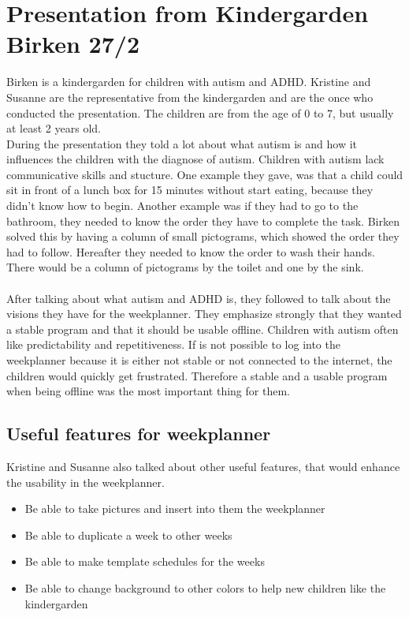\section{Presentation from Kindergarden Birken 27/2}
Birken is a kindergarden for children with autism and ADHD.
Kristine and Susanne are the representative from the kindergarden and are the once who conducted the presentation.
The children are from the age of 0 to 7, but usually at least 2 years old.
\\
During the presentation they told a lot about what autism is and how it influences the children with the diagnose of autism.
Children with autism lack communicative skills and stucture. 
One example they gave, was that a child could sit in front of a lunch box for 15 minutes without start eating, because they didn't know how to begin.
Another example was if they had to go to the bathroom, they needed to know the order they have to complete the task.
Birken solved this by having a column of small pictograms, which showed the order they had to follow. 
Hereafter they needed to know the order to wash their hands.
There would be a column of pictograms by the toilet and one by the sink.
\\\\
After talking about what autism and ADHD is, they followed to talk about the visions they have for the weekplanner.
They emphasize strongly that they wanted a stable program and that it should be usable offline.
Children with autism often like predictability and repetitiveness. 
If is not possible to log into the weekplanner because it is either not stable or not connected to the internet, the children would quickly get frustrated.
Therefore a stable and a usable program when being offline was the most important thing for them.

\subsection{Useful features for weekplanner}
Kristine and Susanne also talked about other useful features, that would enhance the usability in the weekplanner.

\begin{itemize}
    \item Be able to take pictures and insert into them the weekplanner
    \item Be able to duplicate a week to other weeks
    \item Be able to make template schedules for the weeks
    \item Be able to change background to other colors to help new children like the kindergarden 
\end{itemize}

